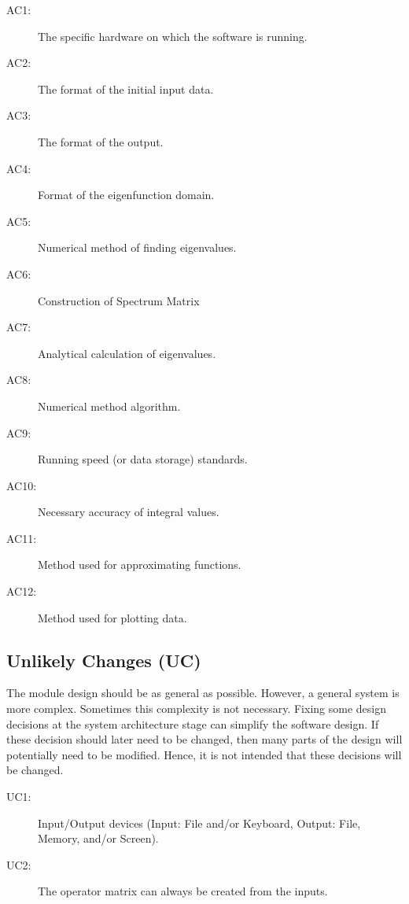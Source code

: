 \documentclass[12pt, titlepage]{article}
\begin{document}
	\begin{description}
		\item[AC1:] The specific hardware on which the software is running.\\
		\item[AC2:] The format of the initial input data.\\
		\item[AC3:] The format of the output.\\
		\item[AC4:] Format of the eigenfunction domain. \\
		\item[AC5:] Numerical method of finding eigenvalues. \\ 
		\item[AC6:] Construction of Spectrum Matrix \\ 
		\item[AC7:] Analytical calculation of eigenvalues. \\
		\item[AC8:] Numerical method algorithm. \\ 
		\item[AC9:] Running speed (or data storage) standards. \\ 
		\item[AC10:] Necessary accuracy of integral values. \\ 
		\item[AC11:] Method used for approximating functions. \\
		\item[AC12:] Method used for plotting data. \\
	\end{description}
	
	\subsection{Unlikely Changes (UC)} \label{SecUchange}
	
	The module design should be as general as possible. However, a general 
	system is
	more complex. Sometimes this complexity is not necessary. Fixing some design
	decisions at the system architecture stage can simplify the software 
	design. If
	these decision should later need to be changed, then many parts of the 
	design
	will potentially need to be modified. Hence, it is not intended that these
	decisions will be changed.
	
	\begin{description}
		\item[UC1:] Input/Output devices
		(Input: File and/or Keyboard, Output: File, Memory, and/or Screen).
		\item[UC2:] The operator matrix can always be 
		created from 
		the inputs.
		
	\end{description}
	
\end{document}
